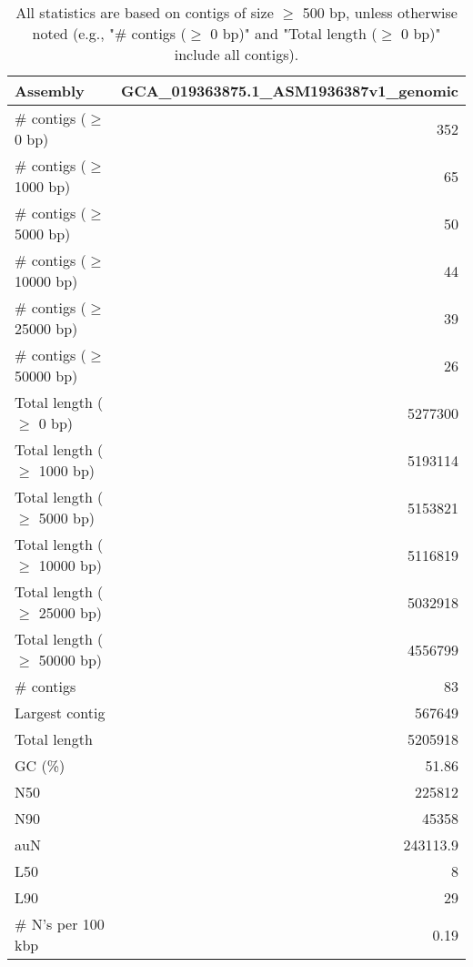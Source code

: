 \documentclass[12pt,a4paper]{article}
\begin{document}
\begin{table}[ht]
\begin{center}
\caption{All statistics are based on contigs of size $\geq$ 500 bp, unless otherwise noted (e.g., "\# contigs ($\geq$ 0 bp)" and "Total length ($\geq$ 0 bp)" include all contigs).}
\begin{tabular}{|l*{1}{|r}|}
\hline
Assembly & GCA\_019363875.1\_ASM1936387v1\_genomic \\ \hline
\# contigs ($\geq$ 0 bp) & 352 \\ \hline
\# contigs ($\geq$ 1000 bp) & 65 \\ \hline
\# contigs ($\geq$ 5000 bp) & 50 \\ \hline
\# contigs ($\geq$ 10000 bp) & 44 \\ \hline
\# contigs ($\geq$ 25000 bp) & 39 \\ \hline
\# contigs ($\geq$ 50000 bp) & 26 \\ \hline
Total length ($\geq$ 0 bp) & 5277300 \\ \hline
Total length ($\geq$ 1000 bp) & 5193114 \\ \hline
Total length ($\geq$ 5000 bp) & 5153821 \\ \hline
Total length ($\geq$ 10000 bp) & 5116819 \\ \hline
Total length ($\geq$ 25000 bp) & 5032918 \\ \hline
Total length ($\geq$ 50000 bp) & 4556799 \\ \hline
\# contigs & 83 \\ \hline
Largest contig & 567649 \\ \hline
Total length & 5205918 \\ \hline
GC (\%) & 51.86 \\ \hline
N50 & 225812 \\ \hline
N90 & 45358 \\ \hline
auN & 243113.9 \\ \hline
L50 & 8 \\ \hline
L90 & 29 \\ \hline
\# N's per 100 kbp & 0.19 \\ \hline
\end{tabular}
\end{center}
\end{table}
\end{document}
